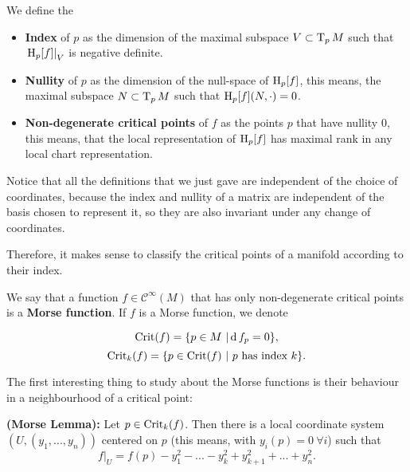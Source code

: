 \begin{deff}
	We define the

\begin{itemize}
	\item {\bf Index} of $p$ as the dimension of the maximal subspace $V \subset \operatorname T_pM$ such that $\left. \operatorname H_p[f] \right|_V$ is negative definite.
	\item {\bf Nullity} of $p$ as the dimension of the null-space of $\operatorname H_p[f]$, this means, the maximal subspace $N \subset \operatorname T_pM$ such that $\operatorname H_p[f](N,\cdot) = 0$.
	\item {\bf Non-degenerate critical points} of $f$ as the points $p$ that have nullity $0$, this means, that the local representation of $\operatorname H_p[f]$ has maximal rank in any local chart representation.
\end{itemize}
\end{deff}

Notice that all the definitions that we just gave are independent of the choice of coordinates, because the index and nullity of a matrix are independent of the basis chosen to represent it, so they are also invariant under any change of coordinates.

Therefore, it makes sense to classify the critical points of a manifold according to their index.

\begin{deff}
	We say that a function $f \in \mathcal{C}^{\infty}(M)$ that has only non-degenerate critical points is a {\bf Morse function}.
	If $f$ is a Morse function, we denote

	\begin{displaymath}
		\text{Crit}(f) = \{ p \in M \ | \operatorname d f_p = 0 \} ,
	\end{displaymath}
	\begin{displaymath}
		\crit_k(f) = \{p \in \crit(f) \ | \text{ $p$ has index $k$}\} .
	\end{displaymath}
\end{deff}

The first interesting thing to study about the Morse functions is their behaviour in a neighbourhood of a critical point:

\begin{prop} \label{morselemma}
	{\bf (Morse Lemma):} Let $p \in \text{Crit}_k(f)$. Then there is a local coordinate system $(U,(y_1,...,y_n))$ centered on $p$ (this means, with $y_i(p) = 0 \ \forall i$) such that
$$\left. f \right|_U = f(p) - y_1^2 - ... - y_k^2 + y_{k+1}^2 + ... + y_n^2 .$$
\end{prop}

